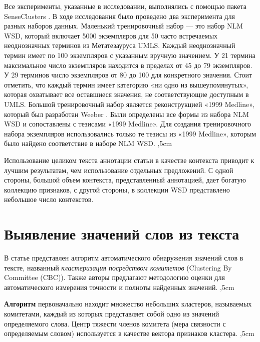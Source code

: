 \documentclass{article}
\begin{document}
\begin{articletext}
Все эксперименты, указанные в исследовании, выполнялись с помощью пакета SenseClusters \cite{SC:website}. В ходе исследования было проведено два эксперимента для разных наборов данных. Маленький тренировочный набор --- это набор NLM WSD, который включает 5000 экземпляров для 50 часто встречаемых неоднозначных терминов из Метатезауруса UMLS. Каждый неоднозначный термин имеет по 100 экземпляров с указанным вручную значением. У 21 термина максимальное число экземпляров находится в пределах от 45 до 79 экземпляров. У 29 терминов число экземпляров от 80 до 100 для  конкретного значения. Стоит отметить, что каждый термин имеет категорию «ни одно из вышеупомянутых», которая охватывает все оставшиеся значения, не соответствующие доступным в UMLS. Большой тренировочный набор является реконструкцией «1999 Medline», который был разработан Weeber \cite{Weeber 2001}. Были определены все формы из набора NLM WSD и сопоставлены с тезисами «1999 Medline». Для создания тренировочного набора экземпляров использовались только те тезисы из «1999 Medline», которым было найдено соответствие в наборе NLM WSD.
,5cm

Использование целиком текста аннотации статьи в качестве контекста приводит к лучшим результатам, чем использование отдельных предложений. С одной стороны, большой объем контекста, представленный аннотацией, дает богатую коллекцию признаков, с другой стороны, в коллекции WSD представлено небольшое число контекстов.

\section{Выявление значений слов из текста}
\begin{flushright}
\end{flushright}

В статье \cite{Pantel 2002} представлен алгоритм автоматического обнаружения значений слов в тексте, названный \textit{кластеризация посредством комитетов} (Clustering By Committee (CBC)). Также авторы предлагают методологию оценки для автоматического измерения точности и полноты найденных значений.
,5cm

\textbf{Алгоритм} первоначально находит множество небольших кластеров, называемых комитетами, каждый из которых представляет собой одно из значений определяемого слова. Центр тяжести  членов комитета (мера связности с определяемым словом) используется в качестве вектора признаков кластера.
,5cm


\end{articletext}
\end{document}
